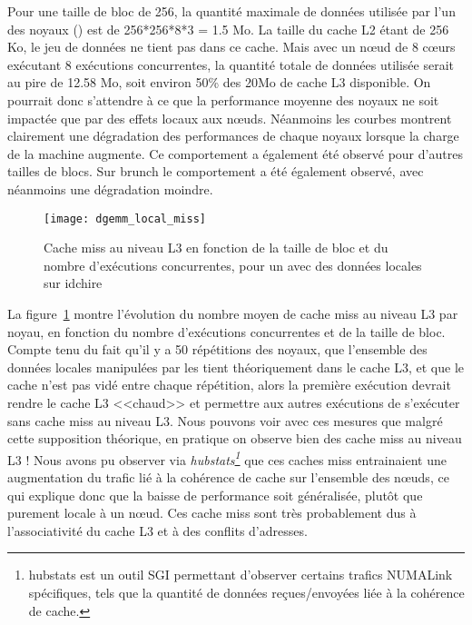 Pour une taille de bloc de 256, la quantité maximale de données utilisée par l'un des noyaux (\gemm) est de 256*256*8*3 = 1.5 Mo. La taille du cache L2 étant de 256 Ko, le jeu de données ne tient pas dans ce cache. Mais avec un nœud de 8 cœurs exécutant 8 exécutions concurrentes, la quantité totale de données utilisée serait au pire de 12.58 Mo, soit environ 50\% des 20Mo de cache L3 disponible.
On pourrait donc s'attendre à ce que la performance moyenne des noyaux ne soit impactée que par des effets locaux aux nœuds.
Néanmoins les courbes montrent clairement une dégradation des performances de chaque noyaux lorsque la charge de la machine augmente.
Ce comportement a également été observé pour d'autres tailles de blocs. Sur brunch le comportement a été également observé, avec néanmoins une dégradation moindre.

\begin{figure}[h!]
  \centering
  \texttt{[image: dgemm\_local\_miss]}
  \caption{Cache miss au niveau L3 en fonction de la taille de bloc et du nombre d'exécutions concurrentes, pour un \gemm avec des données locales sur idchire}\label{fig:contribs:apps:cholesky:miss-L3-local}
\end{figure}

La figure~\ref{fig:contribs:apps:cholesky:miss-L3-local} montre l'évolution du nombre moyen de cache miss au niveau L3 par noyau, en fonction du nombre d'exécutions concurrentes et de la taille de bloc.
Compte tenu du fait qu'il y a 50 répétitions des noyaux, que l'ensemble des données locales manipulées par les \gemm tient théoriquement dans le cache L3, et que le cache n'est pas vidé entre chaque répétition, alors la première exécution devrait rendre le cache L3 <<chaud>> et permettre aux autres exécutions de s'exécuter sans cache miss au niveau L3.
Nous pouvons voir avec ces mesures que malgré cette supposition théorique, en pratique on observe bien des cache miss au niveau L3 !
Nous avons pu observer via \emph{hubstats\footnote{hubstats est un outil SGI permettant d'observer certains trafics NUMALink spécifiques, tels que la quantité de données reçues/envoyées liée à la cohérence de cache.}} que ces caches miss entrainaient une augmentation du trafic lié à la cohérence de cache sur l'ensemble des nœuds, ce qui explique donc que la baisse de performance soit généralisée, plutôt que purement locale à un nœud.
Ces cache miss sont très probablement dus à l'associativité du cache L3 et à des conflits d'adresses.



